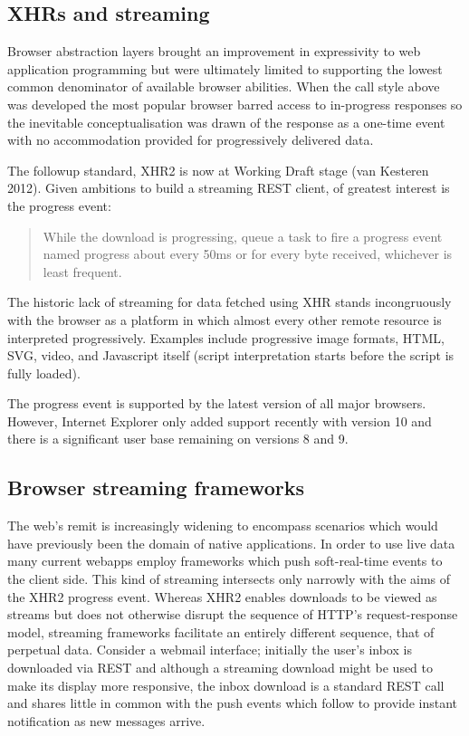\documentclass[12pt, ]{article}
\begin{document}
\subsection{XHRs and streaming}\label{xhrs-and-streaming}

\label{xhrsandstreaming}

Browser abstraction layers brought an improvement in expressivity to web
application programming but were ultimately limited to supporting the
lowest common denominator of available browser abilities. When the call
style above was developed the most popular browser barred access to
in-progress responses so the inevitable conceptualisation was drawn of
the response as a one-time event with no accommodation provided for
progressively delivered data.

The followup standard, XHR2 is now at Working Draft stage (van Kesteren
2012). Given ambitions to build a streaming REST client, of greatest
interest is the progress event:

\begin{quote}
While the download is progressing, queue a task to fire a progress event
named progress about every 50ms or for every byte received, whichever is
least frequent.
\end{quote}

The historic lack of streaming for data fetched using XHR stands
incongruously with the browser as a platform in which almost every other
remote resource is interpreted progressively. Examples include
progressive image formats, HTML, SVG, video, and Javascript itself
(script interpretation starts before the script is fully loaded).

The progress event is supported by the latest version of all major
browsers. However, Internet Explorer only added support recently with
version 10 and there is a significant user base remaining on versions 8
and 9.

\subsection{Browser streaming
frameworks}\label{browser-streaming-frameworks}

\label{browserstreamingframeworks}

The web's remit is increasingly widening to encompass scenarios which
would have previously been the domain of native applications. In order
to use live data many current webapps employ frameworks which push
soft-real-time events to the client side. This kind of streaming
intersects only narrowly with the aims of the XHR2 progress event.
Whereas XHR2 enables downloads to be viewed as streams but does not
otherwise disrupt the sequence of HTTP's request-response model,
streaming frameworks facilitate an entirely different sequence, that of
perpetual data. Consider a webmail interface; initially the user's inbox
is downloaded via REST and although a streaming download might be used
to make its display more responsive, the inbox download is a standard
REST call and shares little in common with the push events which follow
to provide instant notification as new messages arrive.
\end{document}
